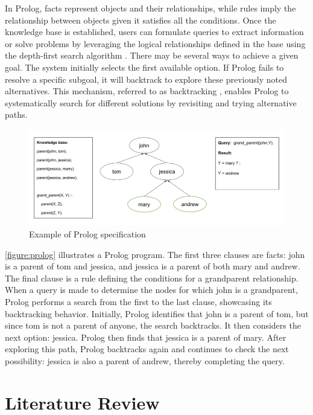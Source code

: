 In Prolog, facts represent objects and their relationships, while rules imply the relationship between objects given it satisfies all the conditions. Once the knowledge base is established, users can formulate queries to extract information or solve problems by leveraging the logical relationships defined in the base using the depth-first search algorithm \cite{Chowdhary2020}. There may be several ways to achieve a given goal. The system initially selects the first available option. If Prolog fails to resolve a specific subgoal, it will backtrack to explore these previously noted alternatives. This mechanism, referred to as backtracking \cite{Chowdhary2020}, enables Prolog to systematically search for different solutions by revisiting and trying alternative paths.

\begin{figure}[h]
    \centering
    \includegraphics[width=1\textwidth]{Packages/Prolog.png}
    \caption{Example of Prolog specification}
    \label{figure:prolog}
\end{figure}

\autoref{figure:prolog} illustrates a Prolog program. The first three clauses are facts: john is a parent of tom and jessica, and jessica is a parent of both mary and andrew. The final clause is a rule defining the conditions for a grandparent relationship. When a query is made to determine the nodes for which john is a grandparent, Prolog performs a search from the first to the last clause, showcasing its backtracking behavior. Initially, Prolog identifies that john is a parent of tom, but since tom is not a parent of anyone, the search backtracks. It then considers the next option: jessica. Prolog then finds that jessica is a parent of mary. After exploring this path, Prolog backtracks again and continues to check the next possibility: jessica is also a parent of andrew, thereby completing the query.

\newpage
\section{Literature Review}

